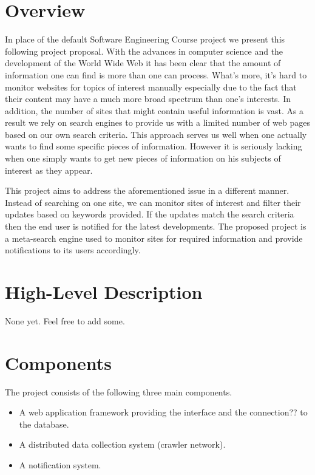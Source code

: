 \documentclass[a4paper,10pt]{article} \usepackage{anysize}
\begin{document}



\section{Overview}
    In place of the default Software Engineering Course project we present
    this following project proposal. With the advances in computer science and
    the development of the World Wide Web it has been clear that the amount
    of information one can find is more than one can process. What's more, it's
    hard to monitor websites for topics of interest manually especially due to
    the fact that their content may have a much more broad spectrum than one's
    interests. In addition, the number of sites that might contain useful
    information is vast. As a result we rely on search engines to provide us
    with a limited number of web pages based on our own search criteria. This
    approach serves us well when one actually wants to find some specific
    pieces of information. However it is seriously lacking when one simply
    wants to get new pieces of information on his subjects of interest as they
    appear. 

    This project aims to address the aforementioned issue in a different
    manner. Instead of searching on one site, we can monitor sites of
    interest and filter their updates based on keywords provided. If the
    updates match the search criteria then the end user is notified for the
    latest developments. The proposed project is a meta-search engine used to
    monitor sites for required information and provide notifications to its
    users accordingly. 

\section{High-Level Description}
    None yet. Feel free to add some.
\section{Components}
    The project consists of the following three main components.
    \begin{itemize}
        \item A web application framework providing the interface and the
            connection?? to the database.
        \item A distributed data collection system (crawler network).
        \item A notification system.
    \end{itemize}
\end{document}
